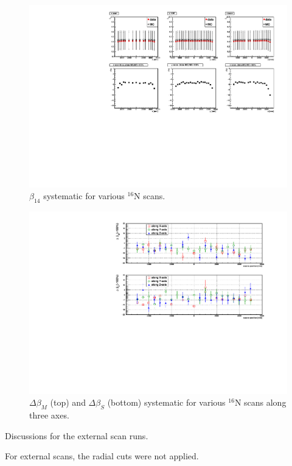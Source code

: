 \begin{figure}[htbp]
	\centering
	\includegraphics[width=15cm]{beta14_allScans.pdf}
	\caption{$\beta_{14}$ systematic for various $^{16}$N scans.}
	\label{beta14_scans}
\end{figure}

\begin{figure}[htbp]
	\centering
	\includegraphics[width=16cm]{angularResol_scanXYZ.pdf}
	\caption{$\Delta\beta_{M}$ (top) and $\Delta\beta_{S}$ (bottom) systematic for various $^{16}$N scans along three axes.}
	\label{xyzScans}
\end{figure}

Discussions for the external scan runs.

For external scans, the radial cuts were not applied. 

